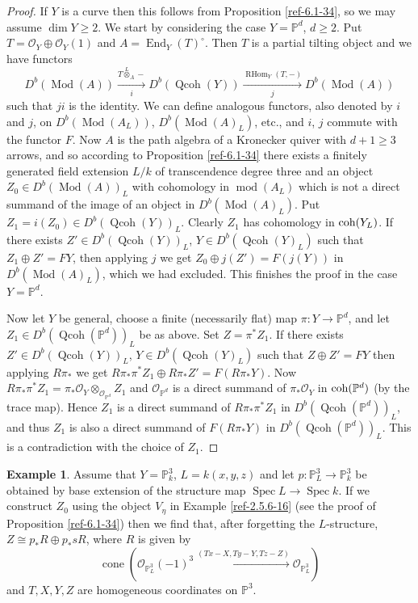 \documentclass{amsart}
\numberwithin{equation}{section}
\let\cal\mathcal
\let\blb\mathbb
\theoremstyle{definition}
\newtheorem{example}[lemma]{Example}
\theoremstyle{remark}
\begin{document}
\begin{proof}
If $Y$ is a curve then this follows from Proposition \ref{ref-6.1-34}, so we may assume $\dim Y\ge 2$. We start by considering the case
$Y={{\blb P}}^d$, $d\ge 2$. Put $T={{\cal O}}_Y\oplus {{\cal O}}_Y(1)$ and $A={\operatorname {End}}_Y(T)^\circ$. Then $T$ is a partial tilting object and we have functors
\[
D^b({\operatorname{Mod}}(A))\xrightarrow[i]{T{\overset{L}{\otimes}}_A-} D^b({\operatorname{Qcoh}}(Y))\xrightarrow[j]{{\operatorname {RHom}}_Y(T,-)} D^b({\operatorname{Mod}}(A))
\]
such that $ji$ is the identity. We can define analogous functors, also denoted by $i$ and $j$, on $D^b({\operatorname{Mod}}(A_L))$, $D^b({\operatorname{Mod}}(A)_L)$, etc., and $i$, $j$ commute with the functor $F$. Now $A$ is the path algebra of a Kronecker quiver with $d+1\ge 3$ arrows, and so according to Proposition \ref{ref-6.1-34} there exists
a finitely generated field extension $L/k$ of transcendence degree three and an object $Z_0\in D^b({\operatorname{Mod}}(A))_L$ with cohomology in ${\operatorname{mod}}(A_L)$ which is not a direct summand of the image
of an object in $D^b({\operatorname{Mod}}(A)_L)$. Put $Z_1=i(Z_0)\in D^b({\operatorname{Qcoh}}(Y))_L$. Clearly $Z_1$ has cohomology in ${\mathop{\text{\upshape{coh}}}}(Y_L)$.
If there exists $Z'\in D^b({\operatorname{Qcoh}}(Y))_L$, $Y\in D^b({\operatorname{Qcoh}}(Y)_L)$ such that $Z_1\oplus Z'=FY$, 
then applying $j$ we get $Z_0\oplus j(Z')=F(j(Y))$ in $D^b({\operatorname{Mod}}(A)_L)$, which we had excluded. This finishes the proof in the case $Y={{\blb P}}^d$.

Now let $Y$ be general, choose a finite (necessarily flat) map $\pi:Y{\rightarrow} {{\blb P}}^d$, and let $Z_1\in D^b({\operatorname{Qcoh}}({{\blb P}}^d))_L$ be as above.
Set $Z=\pi^\ast Z_1$. 
 If there exists $Z'\in D^b({\operatorname{Qcoh}}(Y))_L$, $Y\in D^b({\operatorname{Qcoh}}(Y)_L)$ such that $Z\oplus Z'=FY$ 
then applying $R\pi_\ast$ we get $R\pi_\ast\pi^\ast Z_1\oplus R\pi_\ast Z'=F(R\pi_\ast Y)$. Now $R\pi_\ast\pi^\ast Z_1=\pi_\ast {{\cal O}}_Y\otimes_{{{\cal O}}_{{{\blb P}}^d}} Z_1$ and ${{\cal O}}_{{{\blb P}}^d}$
is a direct summand of $\pi_\ast{{\cal O}}_Y$ in ${\mathop{\text{\upshape{coh}}}}({{\blb P}}^d)$ (by the trace map).  Hence $Z_1$ is a direct summand of $R\pi_\ast\pi^\ast Z_1$ in $D^b({\operatorname{Qcoh}}({{\blb P}}^d))_L$, and thus
$Z_1$ is also a direct summand of $F(R\pi_\ast Y)$ in $D^b({\operatorname{Qcoh}}({{\blb P}}^d))_L$. This is a contradiction with the choice of $Z_1$.
\end{proof}
\begin{example}
  \label{ref-7.2-42} Assume that $Y={{\blb P}}_k^3$, $L=k(x,y,z)$ and let
  $p:{{\blb P}}^3_L{\rightarrow} {{\blb P}}_k^3$ be obtained by base extension of the structure
  map ${\operatorname {Spec}} L{\rightarrow} {\operatorname {Spec}} k$. If we construct $Z_0$ using the object
  $V_\eta$ in Example \ref{ref-2.5.6-16} (see the proof of
  Proposition \ref{ref-6.1-34}) then we find that, after forgetting the $L$-structure, $Z\cong p_\ast R\oplus
  p_\ast sR$,  where $R$ is given by
\[
\operatorname{cone}({{\cal O}}_{{{\blb P}}^3_L}(-1)^3 \xrightarrow{(Tx-X,Ty-Y,Tz-Z)} {{\cal O}}_{{{\blb P}}^3_L})
\]
and $T,X,Y,Z$ are homogeneous coordinates on ${{\blb P}}^3$.
\end{example}
\end{document}
